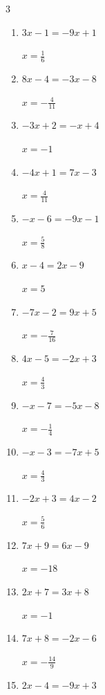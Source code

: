 \begin{multicols}{3}
\begin{enumerate}
  \item $3x-1=-9x+1$

        $\displaystyle x=\frac{1}{6}$

  \item $8x-4=-3x-8$

        $\displaystyle x=-\frac{4}{11}$

\columnbreak %

  \item $-3x+2=-x+4$

        $\displaystyle x=-1$

  \item $-4x+1=7x-3$

        $\displaystyle x=\frac{4}{11}$

  \item $-x-6=-9x-1$

        $\displaystyle x=\frac{5}{8}$

  \item $x-4=2x-9$

        $\displaystyle x=5$

  \item $-7x-2=9x+5$

        $\displaystyle x=-\frac{7}{16}$

  \item $4x-5=-2x+3$

        $\displaystyle x=\frac{4}{3}$

  \item $-x-7=-5x-8$

        $\displaystyle x=-\frac{1}{4}$

  \item $-x-3=-7x+5$

        $\displaystyle x=\frac{4}{3}$

  \item $-2x+3=4x-2$

        $\displaystyle x=\frac{5}{6}$

  \item $7x+9=6x-9$

        $\displaystyle x=-18$

  \item $2x+7=3x+8$

        $\displaystyle x=-1$

  \item $7x+8=-2x-6$

        $\displaystyle x=-\frac{14}{9}$

  \item $2x-4=-9x+3$


\end{enumerate}
\end{multicols}
